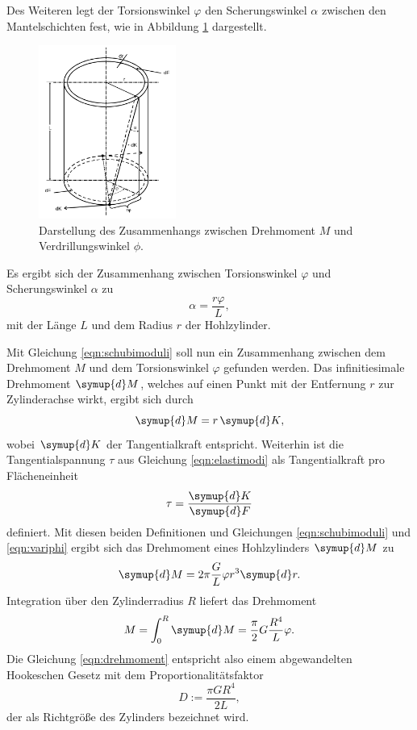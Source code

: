 Des Weiteren legt der Torsionswinkel $\varphi$ den Scherungswinkel $\alpha$ zwischen den
Mantelschichten fest, wie in Abbildung \ref{fig:verdrilltorsion} dargestellt.
\begin{figure}
	\centering
	\includegraphics[width=0.4\textwidth]{Bilder/Zylinder_Verdrillung.png}
	\caption{Darstellung des Zusammenhangs zwischen Drehmoment $M$ und Verdrillungswinkel $\phi$. \cite{Anleitung}}
	\label{fig:verdrilltorsion}
\end{figure}
Es ergibt sich der Zusammenhang zwischen Torsionswinkel $\varphi$ und Scherungswinkel $\alpha$
zu
\begin{equation}
	\label{eqn:variphi}
	\alpha = \frac{r \varphi}{L} \mathrm{,}
\end{equation}
mit der Länge $L$ und dem Radius $r$ der Hohlzylinder.

Mit Gleichung \eqref{eqn:schubimoduli} soll nun ein Zusammenhang zwischen dem Drehmoment $M$
und dem Torsionswinkel $\varphi$ gefunden werden.
Das infinitiesimale Drehmoment $\symup{d} M$, welches auf einen Punkt mit der Entfernung $r$
zur Zylinderachse wirkt, ergibt sich durch
\begin{equation*}
	\symup{d} M = r \, \symup{d}K \mathrm{,}
\end{equation*}
wobei $\symup{d} K$ der Tangentialkraft entspricht.
Weiterhin ist die Tangentialspannung $\tau$ aus Gleichung \eqref{eqn:elastimodi} als
Tangentialkraft pro Flächeneinheit
\begin{equation*}
	\tau = \frac{\symup{d} K}{\symup{d} F}
\end{equation*}
definiert.
Mit diesen beiden Definitionen und Gleichungen \eqref{eqn:schubimoduli} und \eqref{eqn:variphi}
ergibt sich das Drehmoment eines Hohlzylinders $\symup{d} M$ zu
\begin{equation}
	\symup{d} M = 2\pi \frac{G}{L} \varphi r^3 \symup{d}r \mathrm{.}
\end{equation}
Integration über den Zylinderradius $R$ liefert das Drehmoment
\begin{equation}
	\label{eqn:drehmoment}
	M = \int_0^R \symup{d} M = \frac{\pi}{2} G \frac{R^4}{L} \varphi \mathrm{.}
\end{equation}
Die Gleichung \eqref{eqn:drehmoment} entspricht also einem abgewandelten Hookeschen Gesetz
mit dem Proportionalitätsfaktor
\begin{equation}
	\label{eqn:richti}
	D := \frac{\pi G R^4}{2L} \mathrm{,}
\end{equation}
der als Richtgröße des Zylinders bezeichnet wird.

